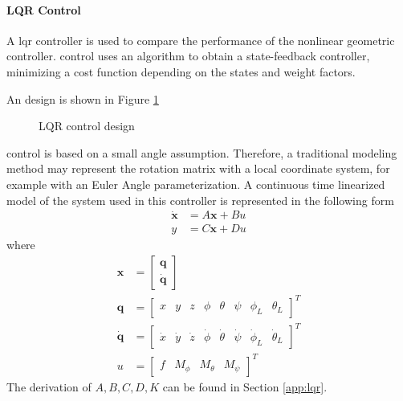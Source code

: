 \paragraph{LQR Control}
A \acf{lqr} controller is used to compare the performance of the nonlinear geometric controller. 
 control uses an algorithm to obtain a state-feedback controller, minimizing a cost function depending on the states and weight factors. 

An  design is shown in Figure \ref{fig:set.lqr}
\begin{figure}[h!]
	\centering
	\caption{LQR control design\label{fig:set.lqr}}
\end{figure}

 control is based on a small angle assumption. Therefore, a traditional modeling method may represent the rotation matrix with a local coordinate system, for example with an Euler Angle parameterization. 
A continuous time linearized model of the system used in this controller is represented in the following form 
\begin{align}\label{eq:ss}
\mathbf{\dot{x} }&=A\mathbf{x}+Bu\\
y&=C\mathbf{x}+Du
\end{align}
where 
\begin{align}\label{eq:state}
	\textbf{x}&=\begin{bmatrix}
		\textbf{q}\\
		\mathbf{\dot{q}}
	\end{bmatrix}\\
	\mathbf{q}&=\begin{bmatrix}
		x&y&z&\phi&\theta&\psi&\phi_L&\theta_L
	\end{bmatrix}^T\\
	\mathbf{\dot{q}}&=\begin{bmatrix}
		\dot{x}&\dot{y}&\dot{z}&\dot{\phi}&\dot{\theta}&\dot{\psi}&\dot{\phi}_L&\dot{\theta}_L
	\end{bmatrix}^T\\
	u&=\begin{bmatrix}
		f&M_\phi&M_\theta&M_\psi
	\end{bmatrix}^T
\end{align}
The derivation of $ A, B, C, D, K $ can be found in Section \ref{app:lqr}. 

